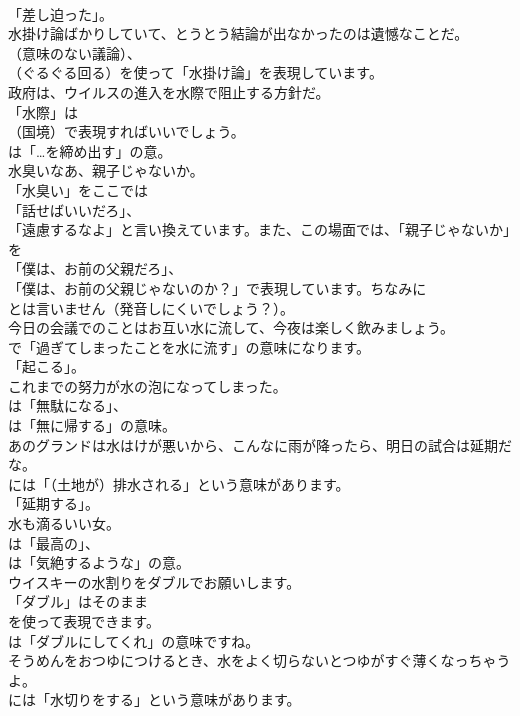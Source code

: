 \documentclass[8pt]{extreport}
\begin{document}
\begin{CJK}{UTF8}{min}
\\	「差し迫った」。	
\\	水掛け論ばかりしていて、とうとう結論が出なかったのは遺憾なことだ。 
\\	（意味のない議論）、
\\	（ぐるぐる回る）を使って「水掛け論」を表現しています。	
\\	政府は、ウイルスの進入を水際で阻止する方針だ。 
\\	「水際」は 
\\	（国境）で表現すればいいでしょう。
\\	は「…を締め出す」の意。	
\\	水臭いなあ、親子じゃないか。 
\\	「水臭い」をここでは
\\	「話せばいいだろ」、
\\	「遠慮するなよ」と言い換えています。また、この場面では、「親子じゃないか」を
\\	「僕は、お前の父親だろ」、
\\	「僕は、お前の父親じゃないのか？」で表現しています。ちなみに
\\	とは言いません（発音しにくいでしょう？）。	
\\	今日の会議でのことはお互い水に流して、今夜は楽しく飲みましょう。 
\\	で「過ぎてしまったことを水に流す」の意味になります。
\\	「起こる」。	
\\	これまでの努力が水の泡になってしまった。 
\\	は「無駄になる」、
\\	は「無に帰する」の意味。	
\\	あのグランドは水はけが悪いから、こんなに雨が降ったら、明日の試合は延期だな。 
\\	には「（土地が）排水される」という意味があります。
\\	「延期する」。	
\\	水も滴るいい女。 
\\	は「最高の」、
\\	は「気絶するような」の意。	
\\	ウイスキーの水割りをダブルでお願いします。 
\\	「ダブル」はそのまま
\\	を使って表現できます。
\\	は「ダブルにしてくれ」の意味ですね。	
\\	そうめんをおつゆにつけるとき、水をよく切らないとつゆがすぐ薄くなっちゃうよ。 
\\	には「水切りをする」という意味があります。

\end{CJK}
\end{document}

